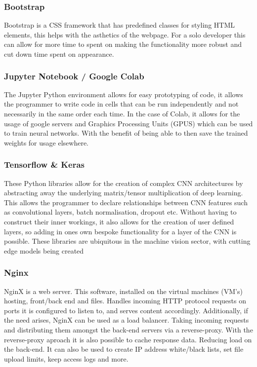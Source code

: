   \subsubsection{Bootstrap}
    Bootstrap is a CSS framework that has predefined classes for styling HTML elements, this helps with the asthetics of the webpage. For a solo developer this can allow for more time to spent on making the functionality more robust and cut down time spent on appearance.
  \subsubsection{Jupyter Notebook / Google Colab}
    The Jupyter Python environment allows for easy prototyping of code, it allows the programmer to write code in cells that can be run independently and not necessarily in the same order each time. In the case of Colab, it allows for the usage of google servers and Graphics Processing Units (GPUS) which can be used to train neural networks. With the benefit of being able to then save the trained weights for usage elsewhere.
  \subsubsection{Tensorflow \& Keras}
    These Python libraries allow for the creation of complex CNN architectures by abstracting away the underlying matrix/tensor multiplication of deep learning. This allows the programmer to declare relationships between CNN features such as convolutional layers, batch normalisation, dropout etc. Without having to construct their inner workings, it also allows for the creation of user defined layers, so adding in ones own bespoke functionality for a layer of the CNN is possible. These libraries are ubiquitous in the machine vision sector, with cutting edge models being created
  \subsubsection{Nginx}
    NginX is a web server. This software, installed on the virtual machines (VM's) hosting, front/back end and files. Handles incoming HTTP protocol requests on ports it is configured to listen to, and serves content accordingly. Additionally, if the need arises, NginX can be used as a load balancer. Taking incoming requests and distributing them amongst the back-end servers via a reverse-proxy. With the reverse-proxy aproach it is also possible to cache response data. Reducing load on the back-end. It can also be used to create IP address white/black lists, set file upload limits, keep access logs and more.
